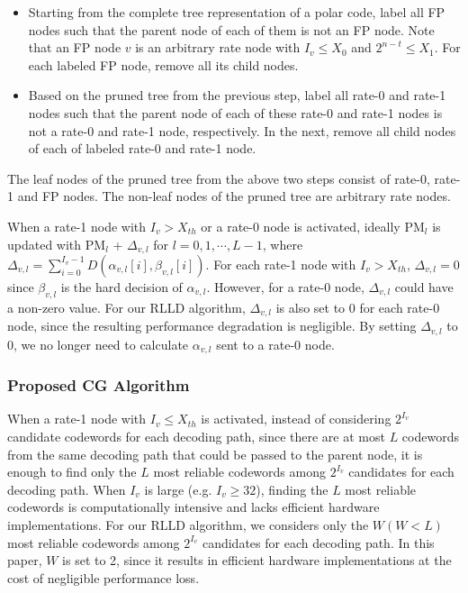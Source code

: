 \documentclass[journal]{IEEEtran}
\begin{document}
\begin{itemize}
\item Starting from the complete tree representation of a polar code, label all FP nodes such that the parent node of each of them is not an FP node. Note that an FP node $v$ is an arbitrary rate node with $I_v\leqslant X_0$ and $2^{n-t} \leqslant X_1$. For each labeled FP node, remove all its child nodes.
\item Based on the pruned tree from the previous step, label all rate-0 and rate-1 nodes such that the parent node of each of these rate-0 and rate-1 nodes is not a rate-0 and rate-1 node, respectively. In the next, remove all child nodes of each of labeled rate-0 and rate-1 node.
\end{itemize}
The leaf nodes of the pruned tree from the above two steps consist of rate-0, rate-1 and FP nodes. The non-leaf nodes of the pruned tree are arbitrary rate nodes.

When a rate-1 node with $I_v > X_{th}$ or a rate-0 node is activated, ideally PM$_l$ is updated with PM$_l$ + $\Delta_{v,l}$ for $l=0,1,\cdots,L-1$, where $\Delta_{v,l} = \sum_{i=0}^{I_v-1}D(\alpha_{v,l}[i], \beta_{v,l}[i])$. For each rate-1 node with $I_v > X_{th}$, $\Delta_{v,l} =0$ since $\beta_{v,l}$ is the hard decision of $\alpha_{v,l}$. However, for a rate-0 node, $\Delta_{v,l}$ could have a non-zero value. For our RLLD algorithm, $\Delta_{v,l}$ is also set to 0 for each rate-0 node, since the resulting performance degradation is negligible. By setting $\Delta_{v,l}$ to 0, we no longer need to calculate $\alpha_{v,l}$ sent to a rate-0 node.

\subsubsection{Proposed CG Algorithm}

When a rate-1 node with $I_v \leqslant X_{th}$ is activated, instead of considering $2^{I_v}$ candidate codewords for each decoding path, since there are at most $L$ codewords from the same decoding path that could be passed to the parent node, it is enough to find only the $L$ most reliable codewords among $2^{I_v}$ candidates for each decoding path. When $I_v$ is large (e.g. $I_v\geqslant 32$), finding the $L$ most reliable codewords is computationally intensive and lacks efficient hardware implementations. For our RLLD algorithm, we considers only the $W (W<L)$ most reliable codewords among $2^{I_v}$ candidates for each decoding path. In this paper, $W$ is set to 2, since it results in efficient hardware implementations at the cost of negligible performance loss.
\end{document}
